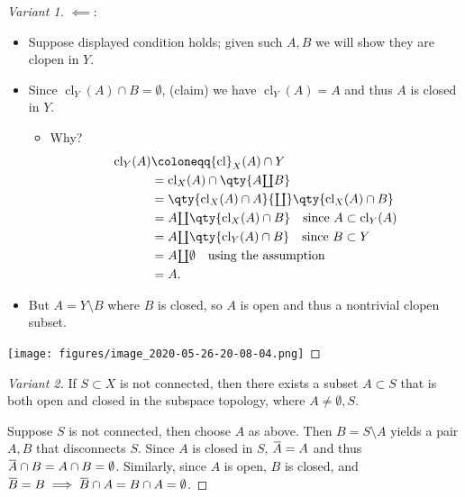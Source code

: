 \begin{solution}
\begin{proof}[Variant 1]
\(\impliedby\):

\begin{itemize}
\tightlist
\item
  Suppose displayed condition holds; given such \(A, B\) we will show
  they are clopen in \(Y\).
\item
  Since \({ \operatorname{cl}} _Y(A) \cap B = \emptyset\), (claim) we
  have \({ \operatorname{cl}} _Y(A) = A\) and thus \(A\) is closed in
  \(Y\).

  \begin{itemize}
  \tightlist
  \item
    Why?
    \begin{align*}     { \operatorname{cl}} _Y(A) &\coloneqq{ \operatorname{cl}} _X(A) \cap Y \\      &= { \operatorname{cl}} _X(A) \cap\qty{A{\textstyle\coprod}B} \\      &= \qty{{ \operatorname{cl}} _X(A) \cap A} {\textstyle\coprod}\qty{{ \operatorname{cl}} _X(A) \cap B} \\     &= A  {\textstyle\coprod}\qty{{ \operatorname{cl}} _X(A) \cap B}      \quad\text{since } A \subset { \operatorname{cl}} _Y(A) \\     &= A {\textstyle\coprod}\qty{{ \operatorname{cl}} _Y(A) \cap B}      \quad \text{since } B \subset Y \\     &= A {\textstyle\coprod}\emptyset \quad\text{using the assumption} \\     &= A     .\end{align*}
  \end{itemize}
\item
  But \(A = Y\setminus B\) where \(B\) is closed, so \(A\) is open and
  thus a nontrivial clopen subset.
\end{itemize}

\texttt{[image: figures/image\_2020-05-26-20-08-04.png]}

\end{proof}

\begin{proof}[Variant 2]

\envlist

If \(S\subset X\) is not connected, then there exists a subset
\(A\subset S\) that is both open and closed in the subspace topology,
where \(A\neq \emptyset, S\).

Suppose \(S\) is not connected, then choose \(A\) as above. Then
\(B = S\setminus A\) yields a pair \(A, B\) that disconnects \(S\).
Since \(A\) is closed in \(S\),
\(\mkern 1.5mu\overline{\mkern-1.5muA\mkern-1.5mu}\mkern 1.5mu = A\) and
thus
\(\mkern 1.5mu\overline{\mkern-1.5muA\mkern-1.5mu}\mkern 1.5mu \cap B = A \cap B = \emptyset\).
Similarly, since \(A\) is open, \(B\) is closed, and
\(\mkern 1.5mu\overline{\mkern-1.5muB\mkern-1.5mu}\mkern 1.5mu = B \implies \mkern 1.5mu\overline{\mkern-1.5muB\mkern-1.5mu}\mkern 1.5mu \cap A = B \cap A = \emptyset\).

\end{proof}

\end{solution}

